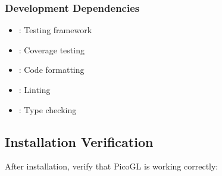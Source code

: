 \documentclass[a4paper,10pt,english,openany,oneside]{sphinxmanual}
\begin{document}
\subsubsection{Development Dependencies}
\label{\detokenize{installation:development-dependencies}}\begin{itemize}
\item {} 
\sphinxAtStartPar
{}: Testing framework

\item {} 
\sphinxAtStartPar
{}: Coverage testing

\item {} 
\sphinxAtStartPar
{}: Code formatting

\item {} 
\sphinxAtStartPar
{}: Linting

\item {} 
\sphinxAtStartPar
{}: Type checking

\end{itemize}


\subsection{Installation Verification}
\label{\detokenize{installation:installation-verification}}
\sphinxAtStartPar
After installation, verify that PicoGL is working correctly:
\end{document}

